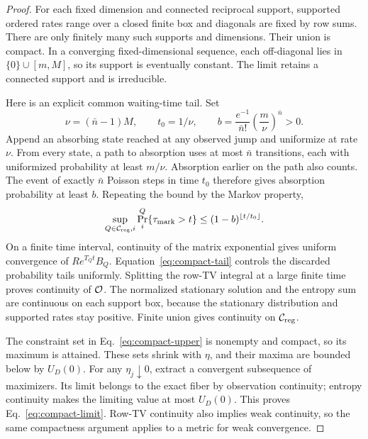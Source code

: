 \begin{proof}
For each fixed dimension and connected reciprocal support, supported
ordered rates range over a closed finite box and diagonals are fixed by
row sums. There are only finitely many such supports and dimensions.
Their union is compact. In a converging fixed-dimensional sequence,
each off-diagonal lies in $\{0\}\cup[m,M]$, so its support is eventually
constant. The limit retains a connected support and is irreducible.

Here is an explicit common waiting-time tail. Set
\begin{equation}
 \nu=(\bar n-1)M,\qquad t_0=1/\nu,\qquad
 b=\frac{e^{-1}}{\bar n!}\left(\frac m\nu\right)^{\bar n}>0.
\end{equation}
Append an absorbing state reached at any observed jump and uniformize
at rate $\nu$. From every state, a path to absorption uses at most
$\bar n$ transitions, each with uniformized probability at least
$m/\nu$. Absorption earlier on the path also counts. The event of
exactly $\bar n$ Poisson steps in time $t_0$ therefore gives absorption
probability at least $b$. Repeating the bound by the Markov property,
\begin{equation}
 \sup_{Q\in\mathcal C_{\rm reg},i}
 \Pr_i^Q\{\tau_{\rm mark}>t\}
 \le(1-b)^{\lfloor t/t_0\rfloor}.
 \label{eq:compact-tail}
\end{equation}
On a finite time interval, continuity of the matrix exponential gives
uniform convergence of $Re^{T_Qt}B_Q$. Equation~\eqref{eq:compact-tail}
controls the discarded probability tails uniformly. Splitting the
row-TV integral at a large finite time proves continuity of $\mathcal O$.
The normalized stationary solution and the entropy sum are continuous
on each support box, because the stationary distribution and supported
rates stay positive. Finite union gives continuity on $\mathcal C_{\rm reg}$.

The constraint set in Eq.~\eqref{eq:compact-upper} is nonempty and
compact, so its maximum is attained. These sets shrink with $\eta$,
and their maxima are bounded below by $U_D(0)$. For any
$\eta_j\downarrow0$, extract a convergent subsequence of maximizers.
Its limit belongs to the exact fiber by observation continuity; entropy
continuity makes the limiting value at most $U_D(0)$. This proves
Eq.~\eqref{eq:compact-limit}. Row-TV continuity also implies weak
continuity, so the same compactness argument applies to a metric for
weak convergence.
\end{proof}

